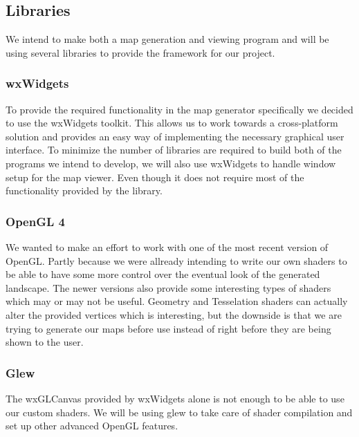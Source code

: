 
\subsection{Libraries}
We intend to make both a map generation and viewing program and will be using several libraries to provide the framework for our project.

\subsubsection{wxWidgets}
To provide the required functionality in the map generator specifically we decided to use the wxWidgets toolkit. This allows us to work towards a cross-platform solution and provides an easy way of implementing the necessary graphical user interface. To minimize the number of libraries are required to build both of the programs we intend to develop, we will also use wxWidgets to handle window setup for the map viewer. Even though it does not require most of the functionality provided by the library.

\subsubsection{OpenGL 4}
We wanted to make an effort to work with one of the most recent version of OpenGL. Partly because we were allready intending to write our own shaders to be able to have some more control over the eventual look of the generated landscape. The newer versions also provide some interesting types of shaders which may or may not be useful. Geometry and Tesselation shaders can actually alter the provided vertices which is interesting, but the downside is that we are trying to generate our maps before use instead of right before they are being shown to the user.

\subsubsection{Glew}
The wxGLCanvas provided by wxWidgets alone is not enough to be able to use our custom shaders. We will be using glew to take care of shader compilation and set up other advanced OpenGL features.